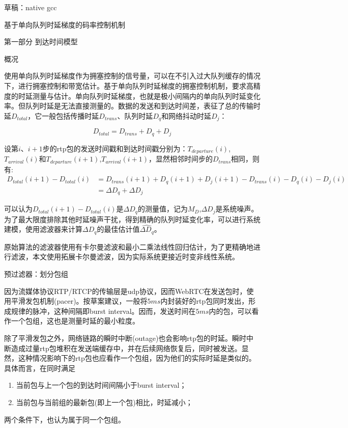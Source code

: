 草稿：native gcc

基于单向队列时延梯度的码率控制机制

第一部分 到达时间模型

概况

使用单向队列时延梯度作为拥塞控制的信号量，可以在不引入过大队列缓存的情况下，进行拥塞控制和带宽估计。基于单向队列时延梯度的拥塞控制机制，要求高精度的时延测量与估计。单向队列时延梯度，也就是极小间隔内的单向队列时延变化率。但队列时延是无法直接测量的。数据的发送和到达时间差，表征了总的传输时延$D_{total}$，它一般包括传播时延$D_{trans}$、队列时延$D_{q}$和网络抖动时延$D_{j}$：

\begin{equation*}
D_{total} = D_{trans} + D_{q} + D_{j}
\end{equation*}

设第$i$、$i+1$步的rtp包的发送时间戳和到达时间戳分别为：$T_{departure}(i)$,$T_{arrival}(i)$和$T_{departure}(i+1)$,$T_{arrival}(i+1)$，显然相邻时间步的$D_{trans}$相同，则有:
\begin{align*}
D_{total}(i+1)-D_{total}(i)
& = D_{trans}(i+1) + D_{q}(i+1) + D_{j}(i+1) - D_{trans}(i)  - D_{q}(i) - D_{j}(i) \\
& = \Delta{D_{q}} +\Delta{D_{j}}
\end{align*}

可以认为$D_{total}(i+1)-D_{total}(i)$是$\Delta{D_{q}}$的测量值，记为$M_{D}$,$\Delta{D_{j}}$是系统噪声。为了最大限度排除其他时延噪声干扰，得到精确的队列时延变化率，可以进行系统建模，使用滤波器来计算$\Delta{D_{q}}$的最佳估计值$\hat{\Delta{D_{q}}}$。

原始算法的滤波器使用有卡尔曼滤波和最小二乘法线性回归估计，为了更精确地进行滤波，本文使用拓展卡尔曼滤波，因为实际系统更接近时变非线性系统。


预过滤器：划分包组

因为流媒体协议RTP/RTCP的传输层是udp协议，因而WebRTC在发送包时，使用平滑发包机制(pacer)。按草案\parencite{rmcat-gcc}建议，一般将$5ms$内封装好的rtp包同时发出，形成规律的脉冲，这种间隔即burst interval。因而，发送时间在$5ms$内的包，可以看作一个包组，这也是测量时延的最小粒度。

除了平滑发包之外，网络链路的瞬时中断(outage)也会影响rtp包的时延。瞬时中断造成过量rtp包堆积在发送端缓存中，并在后续网络恢复后，同时被发送。显然，这种情况影响下的rtp包也应看作一个包组，因为他们的实际时延是类似的。具体而言，在同时满足
\begin{enumerate}
    \item 当前包与上一个包的到达时间间隔小于burst interval；
    \item 当前包与当前组的最新包(即上一个包)相比，时延减小；
\end{enumerate}
两个条件下，也认为属于同一个包组。

